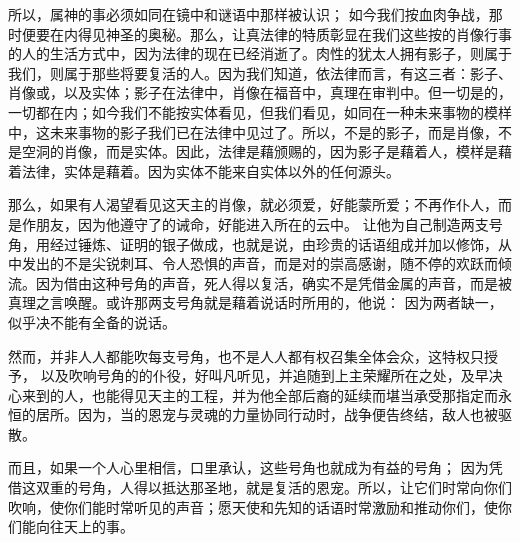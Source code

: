 所以，属神的事必须如同在镜中和谜语中那样被认识； 如今我们按血肉争战，那时便要在内得见神圣的奥秘。那么，让真法律的特质彰显在我们这些按的肖像行事的人的生活方式中，因为法律的现在已经消逝了。肉性的犹太人拥有影子，则属于我们，则属于那些将要复活的人。因为我们知道，依法律而言，有这三者：影子、肖像或，以及实体；影子在法律中，肖像在福音中，真理在审判中。但一切是的，一切都在内；如今我们不能按实体看见，但我们看见，如同在一种未来事物的模样中，这未来事物的影子我们已在法律中见过了。所以，不是的影子，而是肖像，不是空洞的肖像，而是实体。因此，法律是藉颁赐的，因为影子是藉着人，模样是藉着法律，实体是藉着。因为实体不能来自实体以外的任何源头。\par

那么，如果有人渴望看见这天主的肖像，就必须爱，好能蒙所爱；不再作仆人，而是作朋友，因为他遵守了的诫命，好能进入所在的云中。 让他为自己制造两支号角，用经过锤炼、证明的银子做成，也就是说，由珍贵的话语组成并加以修饰，从中发出的不是尖锐刺耳、令人恐惧的声音，而是对的崇高感谢，随不停的欢跃而倾流。因为借由这种号角的声音，死人得以复活，确实不是凭借金属的声音，而是被真理之言唤醒。或许那两支号角就是藉着说话时所用的，他说： 因为两者缺一，似乎决不能有全备的说话。\par

然而，并非人人都能吹每支号角，也不是人人都有权召集全体会众，这特权只授予， 以及吹响号角的的仆役，好叫凡听见，并追随到上主荣耀所在之处，及早决心来到的人，也能得见天主的工程，并为他全部后裔的延续而堪当承受那指定而永恒的居所。因为，当的恩宠与灵魂的力量协同行动时，战争便告终结，敌人也被驱散。\par

而且，如果一个人心里相信，口里承认，这些号角也就成为有益的号角； 因为凭借这双重的号角，人得以抵达那圣地，就是复活的恩宠。所以，让它们时常向你们吹响，使你们能时常听见的声音；愿天使和先知的话语时常激励和推动你们，使你们能向往天上的事。\par


